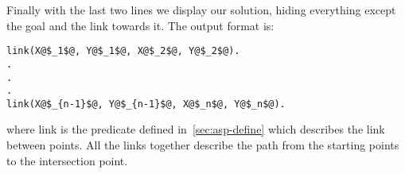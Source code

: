 Finally with the last two lines we display our solution, hiding everything except the goal and the link towards it. The output format is:

\begin{verbatim}
link(X@$_1$@, Y@$_1$@, X@$_2$@, Y@$_2$@).
.
.
.
link(X@$_{n-1}$@, Y@$_{n-1}$@, X@$_n$@, Y@$_n$@).
\end{verbatim}

where link is the predicate defined in~\ref{sec:asp-define} which describes the link between points. All the links together describe the path from the starting points to the intersection point.
